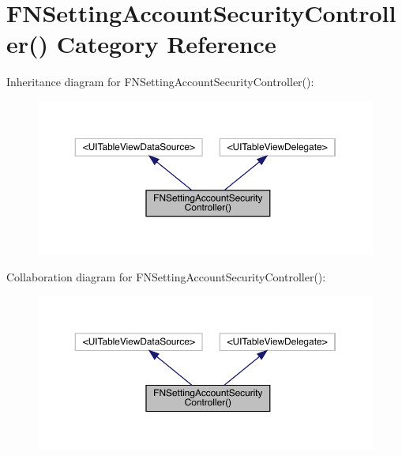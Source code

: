 \hypertarget{category_f_n_setting_account_security_controller_07_08}{}\section{F\+N\+Setting\+Account\+Security\+Controller() Category Reference}
\label{category_f_n_setting_account_security_controller_07_08}


Inheritance diagram for F\+N\+Setting\+Account\+Security\+Controller()\+:\nopagebreak
\begin{figure}[H]
\begin{center}
\leavevmode
\includegraphics[width=350pt]{category_f_n_setting_account_security_controller_07_08__inherit__graph}
\end{center}
\end{figure}


Collaboration diagram for F\+N\+Setting\+Account\+Security\+Controller()\+:\nopagebreak
\begin{figure}[H]
\begin{center}
\leavevmode
\includegraphics[width=350pt]{category_f_n_setting_account_security_controller_07_08__coll__graph}
\end{center}
\end{figure}
